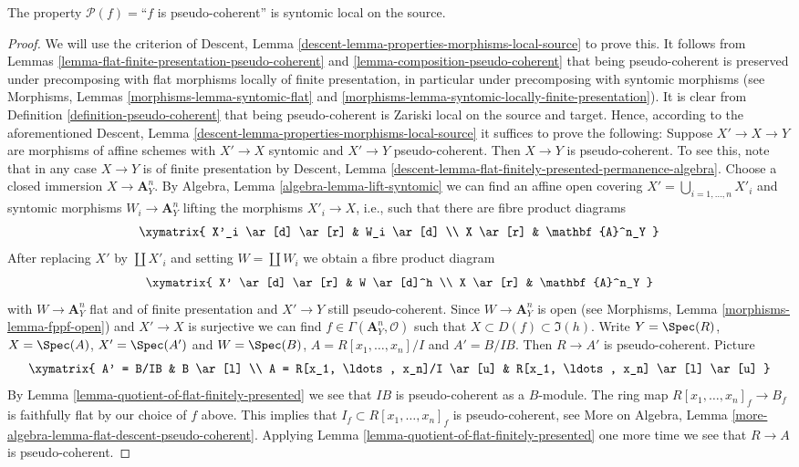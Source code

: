 \begin{lemma}
\label{lemma-pseudo-coherent-syntomic-local-source}
The property $\mathcal{P}(f) =$``$f$ is pseudo-coherent''
is syntomic local on the source.
\end{lemma}

\begin{proof}
We will use the criterion of
Descent, Lemma \ref{descent-lemma-properties-morphisms-local-source}
to prove this. It follows from
Lemmas \ref{lemma-flat-finite-presentation-pseudo-coherent} and
\ref{lemma-composition-pseudo-coherent}
that being pseudo-coherent is preserved under precomposing with
flat morphisms locally of finite presentation, in particular under
precomposing with syntomic morphisms (see
Morphisms, Lemmas \ref{morphisms-lemma-syntomic-flat} and
\ref{morphisms-lemma-syntomic-locally-finite-presentation}).
It is clear from
Definition \ref{definition-pseudo-coherent}
that being pseudo-coherent is
Zariski local on the source and target.
Hence, according to the aforementioned
Descent, Lemma \ref{descent-lemma-properties-morphisms-local-source}
it suffices to prove the following: Suppose $X' \to X \to Y$ are
morphisms of affine schemes with $X' \to X$ syntomic and $X' \to Y$
pseudo-coherent. Then $X \to Y$ is pseudo-coherent.
To see this, note that in any case $X \to Y$ is of finite presentation by
Descent, Lemma \ref{descent-lemma-flat-finitely-presented-permanence-algebra}.
Choose a closed immersion $X \to \mathbf{A}^n_Y$. By
Algebra, Lemma \ref{algebra-lemma-lift-syntomic}
we can find an affine open covering $X' = \bigcup_{i = 1, \ldots, n} X'_i$
and syntomic morphisms $W_i \to \mathbf{A}^n_Y$ lifting the morphisms
$X'_i \to X$, i.e., such that there are fibre product diagrams
$$
\xymatrix{
X'_i \ar[d] \ar[r] & W_i \ar[d] \\
X \ar[r] & \mathbf{A}^n_Y
}
$$
After replacing $X'$ by $\coprod X'_i$ and setting $W = \coprod W_i$
we obtain a fibre product diagram
$$
\xymatrix{
X' \ar[d] \ar[r] & W \ar[d]^h \\
X \ar[r] & \mathbf{A}^n_Y
}
$$
with $W \to \mathbf{A}^n_Y$ flat and of finite presentation and
$X' \to Y$ still pseudo-coherent. Since
$W \to \mathbf{A}^n_Y$ is open (see
Morphisms, Lemma \ref{morphisms-lemma-fppf-open})
and $X' \to X$ is surjective we can find
$f \in \Gamma(\mathbf{A}^n_Y, \mathcal{O})$ such that
$X \subset D(f) \subset \Im(h)$. Write
$Y = \Spec(R)$, $X = \Spec(A)$, $X' = \Spec(A')$
and $W = \Spec(B)$, $A = R[x_1, \ldots, x_n]/I$ and
$A' = B/IB$. Then $R \to A'$ is pseudo-coherent. Picture
$$
\xymatrix{
A' = B/IB & B \ar[l] \\
A = R[x_1, \ldots, x_n]/I \ar[u] & R[x_1, \ldots, x_n] \ar[l] \ar[u]
}
$$
By
Lemma \ref{lemma-quotient-of-flat-finitely-presented}
we see that $IB$ is pseudo-coherent as a $B$-module.
The ring map $R[x_1, \ldots, x_n]_f \to B_f$ is faithfully flat by
our choice of $f$ above. This implies that
$I_f \subset R[x_1, \ldots, x_n]_f$
is pseudo-coherent, see
More on Algebra, Lemma \ref{more-algebra-lemma-flat-descent-pseudo-coherent}.
Applying
Lemma \ref{lemma-quotient-of-flat-finitely-presented}
one more time we see that $R \to A$ is pseudo-coherent.
\end{proof}
